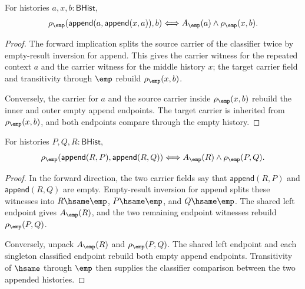 \begin{theorem}
\label{thm:matrix-singleton-classifier-self-context-split}
For histories $a,x,b:\mathsf{BHist}$,
$$
\rho_{\emp}(\mathsf{append}(a,\mathsf{append}(x,a)),b)
\Longleftrightarrow
A_{\emp}(a)\land\rho_{\emp}(x,b).
$$
\end{theorem}
\begin{proof}
The forward implication splits the source carrier of the classifier twice by
empty-result inversion for append. This gives the carrier witness for the
repeated context $a$ and the carrier witness for the middle history $x$; the
target carrier field and transitivity through $\emp$ rebuild
$\rho_{\emp}(x,b)$.

Conversely, the carrier for $a$ and the source carrier inside
$\rho_{\emp}(x,b)$ rebuild the inner and outer empty append endpoints. The
target carrier is inherited from $\rho_{\emp}(x,b)$, and both endpoints compare
through the empty history.
\end{proof}

\begin{theorem}
\label{thm:matrix-singleton-classifier-append-left-cancellation}
For histories $P,Q,R:\mathsf{BHist}$,
$$
\rho_{\emp}(\mathsf{append}(R,P),\mathsf{append}(R,Q))
\Longleftrightarrow
A_{\emp}(R)\land \rho_{\emp}(P,Q).
$$
\end{theorem}
\begin{proof}
In the forward direction, the two carrier fields say that
$\mathsf{append}(R,P)$ and $\mathsf{append}(R,Q)$ are empty. Empty-result
inversion for append splits these witnesses into $R\hsame\emp$,
$P\hsame\emp$, and $Q\hsame\emp$. The shared left endpoint gives
$A_{\emp}(R)$, and the two remaining endpoint witnesses rebuild
$\rho_{\emp}(P,Q)$.

Conversely, unpack $A_{\emp}(R)$ and $\rho_{\emp}(P,Q)$. The shared left
endpoint and each singleton classified endpoint rebuild both empty append
endpoints. Transitivity of $\hsame$ through $\emp$ then supplies the classifier
comparison between the two appended histories.
\end{proof}

